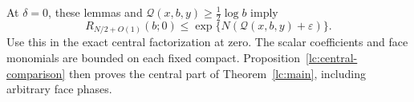 At \(\delta=0\), these lemmas and
\(\mathcal Q(x,b,y)\ge\frac12\log b\) imply
\[
 R_{N/2+O(1)}(b;0)
                  \le\exp\{N(\mathcal Q(x,b,y)+\varepsilon)\}.
\]
Use this in the exact central factorization at zero. The scalar
coefficients and face monomials are bounded on each fixed compact.
Proposition~\ref{lc:central-comparison} then proves the central
part of Theorem~\ref{lc:main}, including arbitrary face phases.

